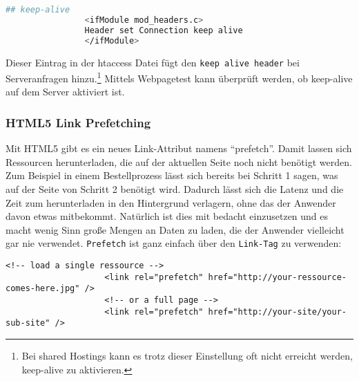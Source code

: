 			\begin{lstlisting}[captionpos=b, caption=htaccess Eintrag nach \autocite{sextonAlive}, label=lst:keepAlive, language=bash]
				## keep-alive
				<ifModule mod_headers.c> 
				Header set Connection keep alive
				</ifModule>
			\end{lstlisting}
				
			Dieser Eintrag in der htaccess Datei fügt den \texttt{keep alive header} bei Serveranfragen hinzu.\footnote{Bei shared Hostings kann es trotz dieser Einstellung oft nicht erreicht werden, keep-alive zu aktivieren.} Mittels Webpagetest kann überprüft werden, ob keep-alive auf dem Server aktiviert ist.

			\subsubsection{HTML5 Link Prefetching} %
			\label{ssub:html5_link_prefetching}
				Mit HTML5 gibt es ein neues Link-Attribut namens "`prefetch"'. Damit lassen sich Ressourcen herunterladen, die auf der aktuellen Seite noch nicht benötigt werden. Zum Beispiel in einem Bestellprozess lässt sich bereits bei Schritt 1 sagen, was auf der Seite von Schritt 2 benötigt wird. Dadurch lässt sich die Latenz und die Zeit zum herunterladen in den Hintergrund verlagern, ohne das der Anwender davon etwas mitbekommt. Natürlich ist dies mit bedacht einzusetzen und es macht wenig Sinn große Mengen an Daten zu laden, die der Anwender vielleicht gar nie verwendet. \texttt{Prefetch} ist ganz einfach über den \texttt{Link-Tag} zu verwenden:
				\begin{lstlisting}[captionpos=b, caption=Prefetching via Link-Tag, label=lst:prefetch]
					<!-- load a single ressource -->
					<link rel="prefetch" href="http://your-ressource-comes-here.jpg" />
					<!-- or a full page -->
					<link rel="prefetch" href="http://your-site/your-sub-site" />
				\end{lstlisting}
				
			
			\pagebreak

%
%	

